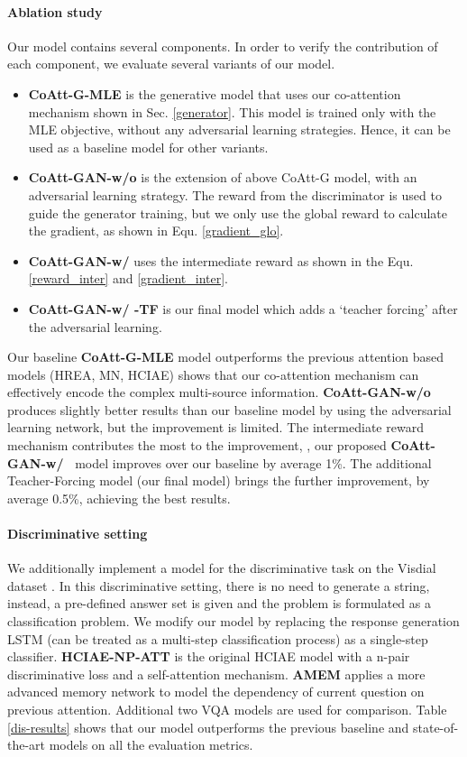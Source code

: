 \documentclass[10pt,twocolumn,letterpaper]{article}
\begin{document}
\paragraph{Ablation study}
Our model contains several components. In order to verify the contribution of each component, we evaluate several variants of our model.
\begin{itemize}
 \item \textbf{CoAtt-G-MLE} is the generative model that uses our co-attention mechanism shown in Sec. \ref{generator}. This model is trained only with the MLE objective, without any adversarial learning strategies. Hence, it can be used as a baseline model for other variants.
 \item \textbf{CoAtt-GAN-w/o } is the extension of above CoAtt-G model, with an adversarial learning strategy. The reward from the discriminator is used to guide the generator training, but we only use the global reward to calculate the gradient, as shown in Equ. \ref{gradient_glo}.
 \item \textbf{CoAtt-GAN-w/ } uses the intermediate reward as shown in the Equ. \ref{reward_inter} and \ref{gradient_inter}.
 \item \textbf{CoAtt-GAN-w/ -TF} is our final model which adds a `teacher forcing' after the adversarial learning.
\end{itemize}
Our baseline \textbf{CoAtt-G-MLE} model outperforms the previous attention based models (HREA, MN, HCIAE) shows that our co-attention mechanism can effectively encode the complex multi-source information. \textbf{CoAtt-GAN-w/o } produces slightly better results than our baseline model by using the adversarial learning network, but the improvement is limited. The intermediate reward mechanism contributes the most to the improvement, \ie, our proposed \textbf{CoAtt-GAN-w/~} model improves over our baseline by average 1\%. The additional Teacher-Forcing model (our final model) brings the further improvement, by average 0.5\%, achieving the best results.


\vspace{-10pt}
\paragraph{Discriminative setting}
We additionally implement a model for the discriminative task on the Visdial dataset \cite{das2016visual}. In this discriminative setting, there is no need to generate a string, instead, a pre-defined answer set is given and the problem is formulated as a classification problem. We modify our model by replacing the response generation LSTM (can be treated as a multi-step classification process) as a single-step classifier. \textbf{HCIAE-NP-ATT} \cite{lu2017best} is the original HCIAE model with a n-pair discriminative loss and a self-attention mechanism. \textbf{AMEM} \cite{seo2017visual} applies a more advanced memory network to model the dependency of current question on previous attention. Additional two VQA models \cite{lu2016hierarchical,yang2015stacked} are used for comparison. Table \ref{dis-results} shows that our model outperforms the previous baseline and state-of-the-art models on all the evaluation metrics.
\end{document}
